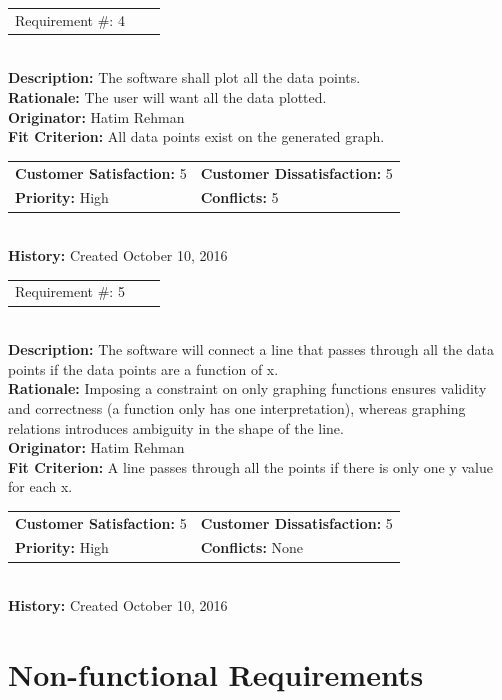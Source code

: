 \documentclass[12pt, titlepage]{article}
\begin{document}
\begin{reqbox}
\begin{tabular}{ccc}Requirement \#: 4
\end{tabular} \\
\textbf{Description:} The software shall plot all the data points.\\
\textbf{Rationale:} The user will want all the data plotted. \\
\textbf{Originator:} Hatim Rehman \\
\textbf{Fit Criterion:} All data points exist on the generated graph.\\
\begin{tabular}{ll}
\textbf{Customer Satisfaction:} 5 & \textbf{Customer Dissatisfaction:} 5 \\
\textbf{Priority:} High & \textbf{Conflicts:} 5\\
\end{tabular} \\
\textbf{History:} Created October 10, 2016
\end{reqbox}

\begin{reqbox}
\begin{tabular}{ccc}Requirement \#: 5
\end{tabular} \\
\textbf{Description:} The software will connect a line that passes through all the data points if the data points are a function of x.\\
\textbf{Rationale:} Imposing a constraint on only graphing functions ensures validity and correctness (a function only has one interpretation), whereas graphing relations introduces ambiguity in the shape of the line. \\
\textbf{Originator:} Hatim Rehman \\
\textbf{Fit Criterion:} A line passes through all the points if there is only one y value for each x.\\
\begin{tabular}{ll}
\textbf{Customer Satisfaction:} 5 & \textbf{Customer Dissatisfaction:} 5 \\
\textbf{Priority:} High & \textbf{Conflicts:} None\\
\end{tabular} \\
\textbf{History:} Created October 10, 2016
\end{reqbox}
\clearpage

\section{Non-functional Requirements} %
\end{document}

